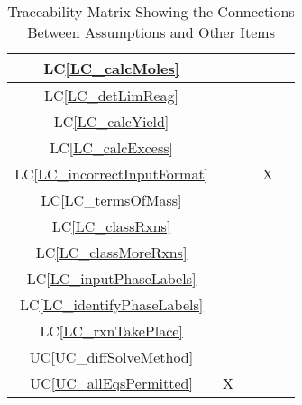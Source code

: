 \documentclass[12pt]{article}
\newcommand{\lcref}[1]{LC\ref{#1}}
\newcommand{\ucref}[1]{UC\ref{#1}}
\begin{document}
\begin{table}[h!]
{\begin{tabular}{|c|c|c|c|c|}
      \lcref{LC_calcMoles}            &                       &                     &                             &                      \\ \hline
      \lcref{LC_detLimReag}           &                       &                     &                             &                      \\ \hline
      \lcref{LC_calcYield}            &                       &                     &                             &                      \\ \hline
      \lcref{LC_calcExcess}           &                       &                     &                             &                      \\ \hline
      \lcref{LC_incorrectInputFormat} &                       &                     & X                           &                      \\ \hline
      \lcref{LC_termsOfMass}          &                       &                     &                             &                      \\ \hline
      \lcref{LC_classRxns}            &                       &                     &                             &                      \\ \hline
      \lcref{LC_classMoreRxns}        &                       &                     &                             &                      \\ \hline
      \lcref{LC_inputPhaseLabels}     &                       &                     &                             &                      \\ \hline
      \lcref{LC_identifyPhaseLabels}  &                       &                     &                             &                      \\ \hline
      \lcref{LC_rxnTakePlace}         &                       &                     &                             &                      \\ \hline
      \ucref{UC_diffSolveMethod}      &                       &                     &                             &                      \\ \hline
      \ucref{UC_allEqsPermitted}      & X                     &                     &                             &                      \\ \hline
    \end{tabular}
    \caption{Traceability Matrix Showing the Connections Between Assumptions and Other Items}
    \label{Table:A_trace}
  }
\end{table}
\end{document}
